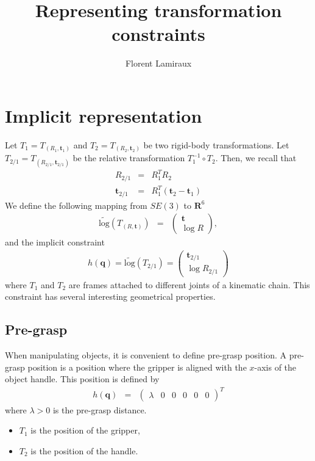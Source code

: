 \documentclass {article}
\title {Representing transformation constraints}
\author {Florent Lamiraux}
\date {}
\newcommand\trans{\mathbf{t}}
\newcommand\conf{\mathbf{q}}
\newcommand\reals{\mathbf{R}}
\newcommand\pseudolog{\widetilde{\mbox{log}}}
\begin{document}
\maketitle

\section {Implicit representation}\label{sec:implicit}

Let $T_1 = T_{(R_1,\trans_1)}$ and $T_2 = T_{(R_2,\trans_2)}$ be two rigid-body transformations. Let $T_{2/1} = T_{(R_{2/1},\trans_{2/1})}$ be the relative transformation $T_1^{-1}\circ T_2$. Then, we recall that
\begin{eqnarray*}
  R_{2/1} &=& R_1^T R_2 \\
  \trans_{2/1} &=& R_1^T (\trans_2-\trans_1)
\end{eqnarray*}
We define the following mapping from $SE(3)$ to $\reals^6$
\begin{eqnarray*}
  \pseudolog (T_{(R,\trans)}) &=& \left(\begin {array}{c} \trans \\ \log R \end{array}\right),
\end {eqnarray*}
and the implicit constraint
\begin {eqnarray}\label{eq:error-se3}
h (\conf) = \pseudolog (T_{2/1}) = \left(\begin {array}{c} \trans_{2/1} \\ \log R_{2/1} \end{array}\right)
\end {eqnarray}
where $T_1$ and $T_2$ are frames attached to different joints of a kinematic chain. This constraint has several interesting geometrical properties.

\subsection {Pre-grasp}

When manipulating objects, it is convenient to define pre-grasp position. A pre-grasp position is a position where the gripper is aligned with the $x$-axis of the object handle. This position is defined by
\begin {eqnarray}\label{eq:pregrasp}
  h (\conf) &=& \left (\begin {array}{cccccc} \lambda & 0 & 0 & 0 & 0 & 0 \end{array}\right)^{T}
\end {eqnarray}
where $\lambda > 0$ is the pre-grasp distance.
\begin{itemize}
\item $T_1$ is the position of the gripper,
\item $T_2$ is the position of the handle.
\end {itemize}
\end{document}
